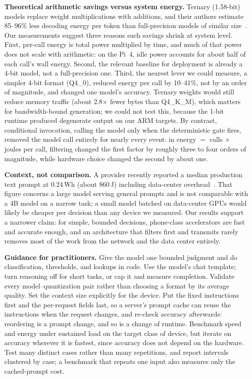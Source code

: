 \documentclass[conference]{IEEEtran}
\begin{document}
\textbf{Theoretical arithmetic savings versus system energy.} Ternary (1.58-bit) models replace weight multiplications with additions, and their authors estimate 85--96\% less decoding energy per token than full-precision models of similar size~\cite{ma2025bitnet2b4t}. Our measurements suggest three reasons such savings shrink at system level. First, per-call energy is total power multiplied by time, and much of that power does not scale with arithmetic: on the Pi~4, idle power accounts for about half of each call's wall energy. Second, the relevant baseline for deployment is already a 4-bit model, not a full-precision one. Third, the nearest lever we could measure, a simpler 4-bit format (Q4\_0), reduced energy per call by 10--41\%, not by an order of magnitude, and changed one model's accuracy. Ternary weights would still reduce memory traffic (about 2.8$\times$ fewer bytes than Q4\_K\_M), which matters for bandwidth-bound generation; we could not test this, because the 1-bit runtime produced degenerate output on our ARM targets. By contrast, conditional invocation, calling the model only when the deterministic gate fires, removed the model call entirely for nearly every event: in energy $=$ calls $\times$ joules per call, filtering changed the first factor by roughly three to four orders of magnitude, while hardware choice changed the second by about one.

\textbf{Context, not comparison.} A provider recently reported a median production text prompt at 0.24\,Wh (about 860\,J) including data-center overhead~\cite{elsworth2025google}. That figure concerns a large model serving general prompts and is not comparable with a 4B model on a narrow task; a small model batched on data-center GPUs would likely be cheaper per decision than any device we measured. Our results support a narrower claim: for simple, bounded decisions, phone-class accelerators are fast and accurate enough, and an architecture that filters first and transmits rarely removes most of the work from the network and the data center entirely.

\textbf{Guidance for practitioners.} Give the model one bounded judgment and do classification, thresholds, and lookups in code. Use the model's chat template; turn reasoning off for short tasks, or cap it and measure completion. Validate every model--quantization pair rather than choosing a format by its average quality. Set the context size explicitly for the device. Put the fixed instructions first and the per-request fields last, so a server's prompt cache can reuse the instructions when the request changes, and re-check accuracy afterwards: reordering is a prompt change, and so is a change of runtime. Benchmark speed and energy under sustained load on the target class of device, but iterate on accuracy wherever it is fastest, since accuracy does not depend on the hardware. Test many distinct cases rather than many repetitions, and report intervals clustered by case; a benchmark that repeats one input also measures only the cached-prompt cost.
\end{document}
